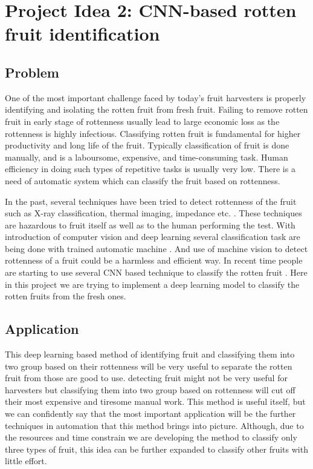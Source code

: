 \documentclass{report}
\begin{document}
\section{Project Idea 2: CNN-based rotten fruit identification}
\subsection{Problem}
One of the most important challenge faced by today's fruit harvesters is properly identifying and isolating the rotten fruit from fresh fruit.  Failing to remove rotten fruit in early stage of rottenness usually lead to large economic loss as the rottenness is highly infectious.  Classifying rotten fruit is fundamental for higher productivity and long life of the fruit. Typically classification of fruit is done manually, and is a laboursome, expensive, and time-consuming task. Human efficiency in doing such types of repetitive tasks is usually very low. There is a need of automatic system which can classify the fruit based on rottenness. \par
 In the past, several techniques have been tried to detect rottenness of the fruit such as X-ray classification, thermal imaging, impedance etc. \cite{rotten1}. These techniques are hazardous to fruit itself as well as to the human performing the test. With introduction of computer vision and deep learning several classification task are being done with trained automatic machine \cite{rotten2}. And use of machine vision to detect rottenness of a fruit could be a harmless and efficient way. In recent time people are starting to use several CNN based technique to classify the rotten fruit \cite{rotten3}. Here in this project we are trying to implement a deep learning model to classify the rotten fruits from the fresh ones.\par
 \subsection{Application}
 This deep learning based method of identifying fruit and classifying them into two group based on their rottenness will be very useful to separate the rotten fruit from those are good to use. detecting fruit might not be very useful for harvesters but classifying them into two group based on rottenness will cut off their most expensive and tiresome manual work. This method is useful itself, but we can confidently say that the most important application will be the further techniques in automation that this method brings into picture. Although, due to the resources and time constrain we are developing the method to classify only three types of fruit, this idea can be further expanded to classify other fruits with little effort.
 \iffalse
 \begin{itemize}
    \item will be applicable to detect rotten fruit
    \item will be helpful for further automation in fruit processing
    \item can be extended to classify many type of fruit
\end{itemize}
\fi
\end{document}
